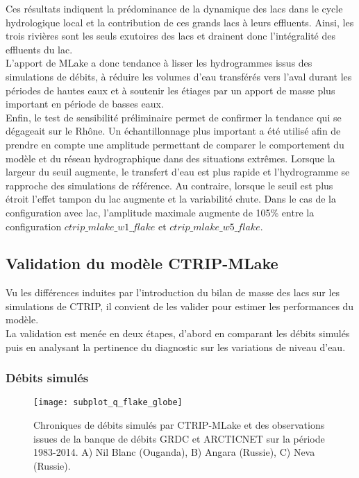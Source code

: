 \noindent Ces résultats indiquent la prédominance de la dynamique des lacs dans le cycle hydrologique local et la contribution de ces grands lacs à leurs effluents. Ainsi, les trois rivières sont les seuls exutoires des lacs et drainent donc l'intégralité des effluents du lac.\\
L'apport de MLake a donc tendance à lisser les hydrogrammes issus des simulations de débits, à réduire les volumes d'eau transférés vers l'aval durant les périodes de hautes eaux et à soutenir les étiages par un apport de masse plus important en période de basses eaux.\\

Enfin, le test de sensibilité préliminaire permet de confirmer la tendance qui se dégageait sur le Rhône. Un échantillonnage plus important a été utilisé afin de prendre en compte une amplitude permettant de comparer le comportement du modèle et du réseau hydrographique dans des situations extrêmes. Lorsque la largeur du seuil augmente, le transfert d'eau est plus rapide et l'hydrogramme se rapproche des simulations de référence. Au contraire, lorsque le seuil est plus étroit l'effet tampon du lac augmente et la variabilité chute. Dans le cas de la configuration avec lac, l'amplitude maximale augmente de 105\% entre la configuration $ctrip\_mlake\_w1\_flake$ et $ctrip\_mlake\_w5\_flake$.

\subsection{{\selectfont Validation du modèle CTRIP-MLake}}
\label{sec:validation_globe}


Vu les différences induites par l'introduction du bilan de masse des lacs sur les simulations de CTRIP, il convient de les valider pour estimer les performances du modèle.\\
La validation est menée en deux étapes, d'abord en comparant les débits simulés puis en analysant la pertinence du diagnostic sur les variations de niveau d'eau.

\subsubsection*{{\selectfont Débits simulés}}
\begin{figure}[h!]
\texttt{[image: subplot\_q\_flake\_globe]}
\caption{Chroniques de débits simulés par CTRIP-MLake et des observations issues de la banque de débits GRDC et ARCTICNET sur la période 1983-2014. A) Nil Blanc (Ouganda), B) Angara (Russie), C) Neva (Russie).}
\label{subplot_q_globe}
\end{figure}

